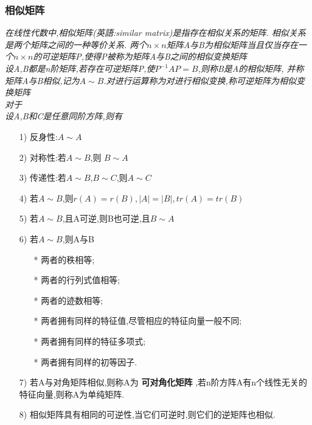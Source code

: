 \documentclass{scrartcl}
\numberwithin{equation}{section}   %
\begin{document}
\subsubsection{相似矩阵}
\textsl{在线性代数中,相似矩阵(英語:similar matrix)是指存在相似关系的矩阵. 相似关系是两个矩阵之间的一种等价关系. 两个$n×n$矩阵A与B为相似矩阵当且仅当存在一个$n×n$的可逆矩阵P,使得P被称为矩阵A与B之间的相似变换矩阵\\设A,B都是n阶矩阵,若存在可逆矩阵P,使$P^{-1}AP=B$,则称B是A的相似矩阵, 并称矩阵A与B相似,记为$A \sim B$.对进行运算称为对进行相似变换,称可逆矩阵为相似变换矩阵\\
    对于\\
    设A,B和C是任意同阶方阵,则有}
\begin{itemize}
    \item [1)] 反身性:$A \sim  A$
    \item [2)] 对称性:若$A \sim B$,则 $B \sim A$
    \item [3)] 传递性:若$A \sim B$,$B \sim C$,则$A \sim C$
    \item [4)] 若$A \sim B$,则$r(A)=r(B),|A|=|B|,tr(A)=tr(B)$
    \item [5)] 若$A \sim B$,且A可逆,则B也可逆,且$B \sim A$
    \item [6)] 若$A \sim B$,则A与B
          \begin{itemize}
              \item [*] 两者的秩相等;
              \item [*] 两者的行列式值相等;
              \item [*] 两者的迹数相等;
              \item [*] 两者拥有同样的特征值,尽管相应的特征向量一般不同;
              \item [*] 两者拥有同样的特征多项式;
              \item [*] 两者拥有同样的初等因子.
          \end{itemize}
    \item [7)] 若A与对角矩阵相似,则称A为 \textbf{可对角化矩阵} ,若n阶方阵A有n个线性无关的特征向量,则称A为单纯矩阵.
    \item [8)]相似矩阵具有相同的可逆性,当它们可逆时,则它们的逆矩阵也相似.
\end{itemize}
\end{document}
